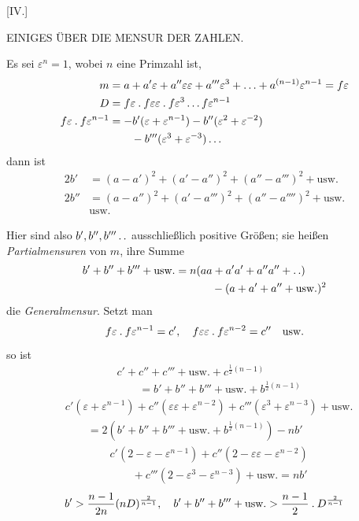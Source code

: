 %
\begin{center}[IV.]\par\medskip
EINIGES ÜBER DIE MENSUR DER ZAHLEN.
\end{center}
Es sei $\varepsilon^n=1$, wobei $n$ eine Primzahl ist,
\[
\begin{aligned}
m&=a+a'\varepsilon+a''\varepsilon\varepsilon+a'''\varepsilon^3+\ldots+a^{(n-1)}\varepsilon^{n-1}=f\varepsilon\\
D&=f\varepsilon\mathbin{.} f\varepsilon\varepsilon\mathbin{.} f\varepsilon^3\ldots f\varepsilon^{n-1}\\
f\varepsilon\mathbin{.} f\varepsilon^{n-1}&=-b'(\varepsilon+\varepsilon^{n-1})-b''(\varepsilon^2+\varepsilon^{-2})\\
&\qquad-b'''(\varepsilon^3+\varepsilon^{-3})\ldots
\end{aligned}
\]
dann ist
\[
\begin{aligned}
2b'&=(a-a')^2+(a'-a'')^2+(a''-a''')^2+\text{usw.}\\
2b''&=(a-a'')^2+(a'-a''')^2+(a''-a'''')^2+\text{usw.}\\
&\text{usw.}
\end{aligned}
\]

Hier sind also $b',b'',b'''\mathinner{.\,.}$ ausschließlich positive Größen; sie heißen \emph{Partialmensuren} von $m$, ihre Summe
\[
\begin{aligned}
b'+b''+b'''+\text{usw.}={}&n(aa+a'a'+a''a''+\mathinner{.\,.})\\
&\qquad-(a+a'+a''+\text{usw.})^2
\end{aligned}
\]
die \emph{Generalmensur}. Setzt man
\[
f\varepsilon\mathbin{.} f\varepsilon^{n-1}=c',\quad f\varepsilon\varepsilon\mathbin{.} f\varepsilon^{n-2}=c''\quad\text{usw.}
\]
so ist
\[
\begin{aligned}
&c'+c''+c'''+\text{usw.}+c^{\frac12(n-1)}\\
&\qquad=b'+b''+b'''+\text{usw.}+b^{\frac12(n-1)}
\end{aligned}
\]
\[
\begin{aligned}
&c'(\varepsilon+\varepsilon^{n-1})+c''(\varepsilon\varepsilon+\varepsilon^{n-2})+c'''(\varepsilon^3+\varepsilon^{n-3})+\text{usw.}\\
&\qquad=2(b'+b''+b'''+\text{usw.}+b^{\frac12(n-1)})-nb'
\end{aligned}
\]
\[
\begin{aligned}
&c'(2-\varepsilon-\varepsilon^{n-1})+c''(2-\varepsilon\varepsilon-\varepsilon^{n-2})\\
&\qquad+c'''(2-\varepsilon^3-\varepsilon^{n-3})+\text{usw.}=nb'
\end{aligned}
\]
\[
b'>\frac{n-1}{2n}(nD)^{\frac2{n-1}},\quad b'+b''+b'''+\text{usw.}>\frac{n-1}{2}\mathbin{.} D^{\frac2{n-1}}
\]

